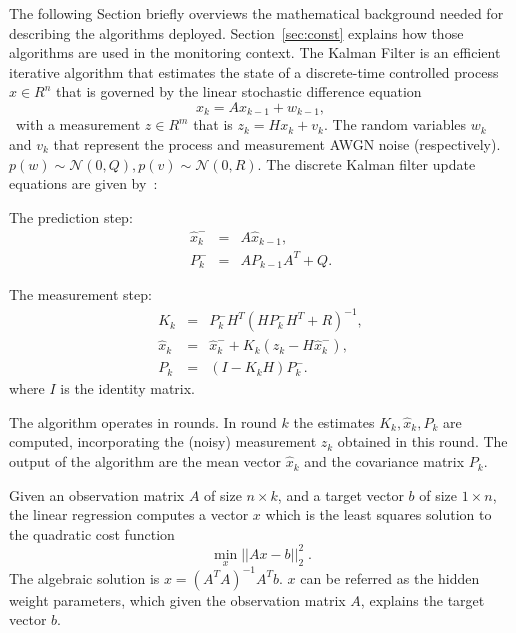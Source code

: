 \documentclass[times, 10pt,twocolumn]{article}
\def\BE{\begin{equation}}
\def\EE{\end{equation}}
\begin{document}
The following Section briefly overviews the mathematical background needed for describing
the algorithms deployed. Section~\ref{sec:const} explains how those algorithms are used in the monitoring
context.
\label{sec:background}
\label{sec:kalman}
The Kalman Filter is an efficient iterative
algorithm that estimates the state of a discrete-time controlled
process $x \in R^n$ that is governed by the linear stochastic
difference equation \BE
x_k = Ax_{k-1} + w_{k-1}, \EE \
with a measurement $z \in R^m$ that is $ z_k = Hx_k + v_k.$ The
random variables $w_k$ and $v_k$ that represent the process and
measurement AWGN noise (respectively). $p(w) \sim \mathcal{N}(0,
Q), p(v) \sim \mathcal{N}(0, R)$.
The discrete Kalman filter update equations are given
by~\cite{Kalman}:

The prediction step:
\begin{subequations}
\begin{eqnarray}
 \hat{x}^-_k &=& A\hat{x}_{k-1}, \label{hat_x_minus_k}\\
 P_k^- &=& AP_{k-1}A^T + Q. \label{p_k_minus}
\end{eqnarray}
\end{subequations}

The measurement step:
\begin{subequations}
\begin{eqnarray}
 K_k &=& P_k^-H^T(HP_k^-H^T + R)^{-1}, \label{kalman_gain} \\
\hat{x}_k &=& \hat{x}^-_k + K_k(z_k - H\hat{x}^-_k),
\label{hat_x_k} \\
 P_k &=& (I-K_kH)P_k^-. \label{p_k}
\end{eqnarray}
\end{subequations}
where $I$ is the identity matrix.

The algorithm operates in rounds. In round $k$ the estimates
$K_k,\hat{x}_k,P_k$ are computed, incorporating the (noisy)
measurement $z_k$ obtained in this round. The output of the
algorithm are the mean vector $\hat{x}_k$ and the covariance
matrix $P_k$.



\label{sec:GLS}
Given an observation matrix $A$ of size $n \times k$, and a target vector $b$ of size $1 \times n$, the linear
regression computes a vector $x$ which is the least squares solution to the quadratic cost function
 \[ \min_x||Ax - b||^2_2\;. \] The algebraic solution is $x = (A^TA)^{-1}A^T b$. $x$ can be referred as the hidden weight parameters, which given the observation matrix $A$, explains the target vector $b$.
\end{document}
